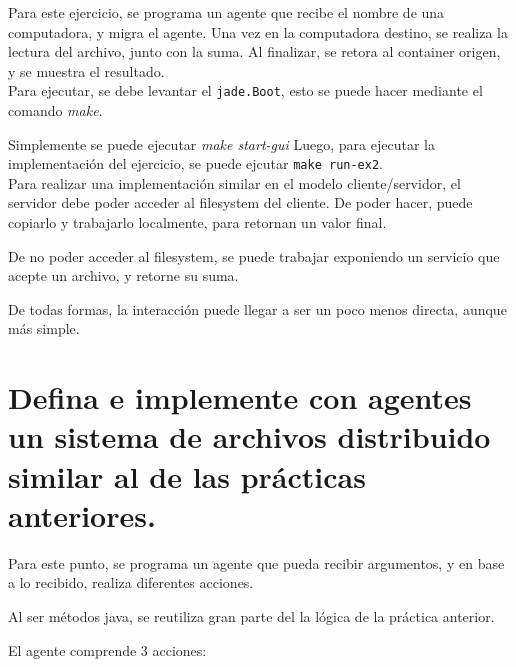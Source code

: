 \documentclass[osajnl,twocolumn,showpacs,superscriptaddress,10pt]{revtex4-1} %
\begin{document}
Para este ejercicio, se programa un agente que recibe el nombre de una computadora,
y migra el agente.
Una vez en la computadora destino, se realiza la lectura del archivo,
junto con la suma.
Al finalizar, se retora al container origen, y se muestra el resultado.\\

Para ejecutar, se debe levantar el \texttt{jade.Boot}, esto se puede hacer
mediante el comando \textit{make}.

Simplemente se puede ejecutar \textit{make start-gui}
Luego, para ejecutar la implementación del ejercicio,
se puede ejcutar \texttt{make run-ex2}. \\

Para realizar una implementación similar en el modelo cliente/servidor, el servidor debe poder acceder
al filesystem del cliente. De poder hacer, puede copiarlo y trabajarlo
localmente, para retornan un valor final.

De no poder acceder al filesystem, se puede trabajar exponiendo un
servicio que acepte un archivo, y retorne su suma.

De todas formas, la interacción puede llegar a ser un poco menos directa,
aunque más simple.

\section{Defina  e  implemente  con  agentes  un  sistema  de  archivos
distribuido  similar  al  de  las prácticas anteriores.}

Para este punto, se programa un agente que pueda recibir argumentos, y
en base a lo recibido, realiza diferentes acciones.

Al ser métodos java, se reutiliza gran parte del la lógica de la
práctica anterior.

El agente comprende 3 acciones:
\end{document}
